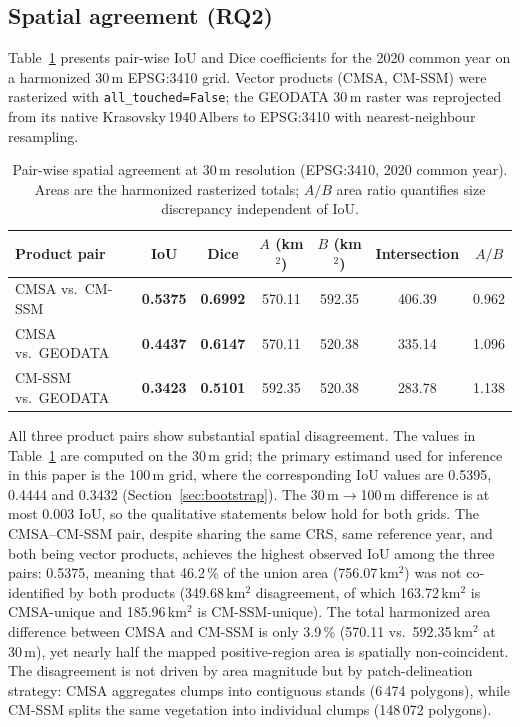 \documentclass[11pt]{article}
\begin{document}
\subsection{Spatial agreement (RQ2)}
\label{sec:results-e3}

Table~\ref{tab:iou30} presents pair-wise IoU and Dice coefficients for the 2020
common year on a harmonized 30\,m EPSG:3410 grid. Vector products (CMSA,
CM-SSM) were rasterized with \texttt{all\_touched=False}; the GEODATA 30\,m
raster was reprojected from its native Krasovsky\,1940\,Albers to EPSG:3410
with nearest-neighbour resampling.

\begin{table}[htpb]
\centering
\caption{\label{tab:iou30}Pair-wise spatial agreement at 30\,m resolution
  (EPSG:3410, 2020 common year). Areas are the harmonized rasterized totals;
  $A/B$ area ratio quantifies size discrepancy independent of IoU.}
\begin{tabular}{l c c c c c c}
\toprule
Product pair & IoU & Dice & $A$ (km$^2$) & $B$ (km$^2$) & Intersection & $A/B$ \\
\midrule
CMSA vs.\ CM-SSM & \textbf{0.5375} & \textbf{0.6992} & 570.11 & 592.35 & 406.39 & 0.962 \\
CMSA vs.\ GEODATA & \textbf{0.4437} & \textbf{0.6147} & 570.11 & 520.38 & 335.14 & 1.096 \\
CM-SSM vs.\ GEODATA & \textbf{0.3423} & \textbf{0.5101} & 592.35 & 520.38 & 283.78 & 1.138 \\
\bottomrule
\end{tabular}
\end{table}

All three product pairs show substantial spatial disagreement. The values in
Table~\ref{tab:iou30} are computed on the 30\,m grid; the primary estimand used
for inference in this paper is the 100\,m grid, where the corresponding IoU
values are 0.5395, 0.4444 and 0.3432 (Section~\ref{sec:bootstrap}). The
30\,m$\rightarrow$100\,m difference is at most 0.003 IoU, so the qualitative
statements below hold for both grids. The CMSA--CM-SSM
pair, despite sharing the same CRS, same reference year, and both being vector
products, achieves the highest observed IoU among the three pairs: 0.5375,
meaning that 46.2\,\% of the union area (756.07\,km$^2$) was not
co-identified by both products (349.68\,km$^2$ disagreement, of which
163.72\,km$^2$ is CMSA-unique and 185.96\,km$^2$ is CM-SSM-unique). The
total harmonized area difference between CMSA and CM-SSM is only 3.9\,\%
(570.11 vs.\ 592.35\,km$^2$ at 30\,m), yet nearly half the mapped
positive-region area is spatially non-coincident. The disagreement is not driven by
area magnitude but by patch-delineation strategy: CMSA aggregates clumps into
contiguous stands (6\,474 polygons), while CM-SSM splits the same vegetation
into individual clumps (148\,072 polygons).
\end{document}
